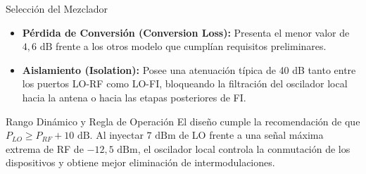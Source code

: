 \documentclass[10pt]{beamer}
\begin{document}
\begin{frame}{Selección del Mezclador}
\begin{itemize}
    \item \textbf{Pérdida de Conversión (Conversion Loss):} Presenta el menor valor de $4,6\text{ dB}$ frente a los otros modelo que cumplían requisitos preliminares.
    \item \textbf{Aislamiento (Isolation):} Posee una atenuación típica de 40 dB tanto entre los puertos LO-RF como LO-FI, bloqueando la filtración del oscilador local hacia la antena o hacia las etapas posteriores de FI.
\end{itemize}

\vspace{0.3cm}
\begin{block}{Rango Dinámico y Regla de Operación}
    El diseño cumple la recomendación de que $P_{LO} \ge P_{RF} + 10\text{ dB}$. Al inyectar $7\text{ dBm}$ de LO frente a una señal máxima extrema de RF de $-12,5\text{ dBm}$, el oscilador local controla la conmutación de los dispositivos y obtiene mejor eliminación de intermodulaciones.
\end{block}
\end{frame}
\end{document}
